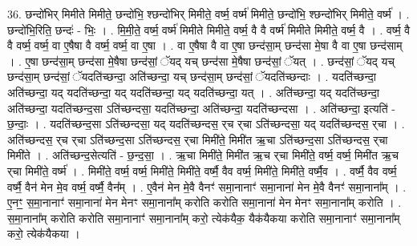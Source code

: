 \documentclass[17pt]{extarticle}
\begin{document}
36. छन्दो॑भिर् मिमीते मिमीते॒ छन्दो॑भि॒ श्छन्दो॑भिर् मिमीते॒ वर्ष्म॒ वर्ष्म॑ मिमीते॒ छन्दो॑भि॒ श्छन्दो॑भिर् मिमीते॒ वर्ष्म॑ । . छन्दो॑भि॒रिति॒ छन्दः॑ - भिः॒ । . मि॒मी॒ते॒ वर्ष्म॒ वर्ष्म॑ मिमीते मिमीते॒ वर्ष्म॒ वै वै वर्ष्म॑ मिमीते मिमीते॒ वर्ष्म॒ वै । . वर्ष्म॒ वै वै वर्ष्म॒ वर्ष्म॒ वा ए॒षैषा वै वर्ष्म॒ वर्ष्म॒ वा ए॒षा । . वा ए॒षैषा वै वा ए॒षा छन्द॑सा॒म् छन्द॑सा मे॒षा वै वा ए॒षा छन्द॑साम् । . ए॒षा छन्द॑सा॒म् छन्द॑सा मे॒षैषा छन्द॑सां॒ ॅयद् यच् छन्द॑सा मे॒षैषा छन्द॑सां॒ ॅयत् । . छन्द॑सां॒ ॅयद् यच् छन्द॑सा॒म् छन्द॑सां॒ ॅयदति॑च्छन्दा॒ अति॑च्छन्दा॒ यच् छन्द॑सा॒म् छन्द॑सां॒ ॅयदति॑च्छन्दाः । . यदति॑च्छन्दा॒ अति॑च्छन्दा॒ यद् यदति॑च्छन्दा॒ यद् यदति॑च्छन्दा॒ यद् यदति॑च्छन्दा॒ यत् । . अति॑च्छन्दा॒ यद् यदति॑च्छन्दा॒ अति॑च्छन्दा॒ यदति॑च्छन्द॒सा ऽति॑च्छन्दसा॒ यदति॑च्छन्दा॒  अति॑च्छन्दा॒ यदति॑च्छन्दसा । . अति॑च्छन्दा॒ इत्यति॑ - छ॒न्दाः॒ । . यदति॑च्छन्द॒सा ऽति॑च्छन्दसा॒ यद् यदति॑च्छन्दस॒ र्‌च र्‌चा ऽति॑च्छन्दसा॒ यद् यदति॑च्छन्दस॒ र्‌चा । . अति॑च्छन्दस॒ र्‌च र्‌चा ऽति॑च्छन्द॒सा ऽति॑च्छन्दस॒ र्‌चा मिमी॑ते॒ मिमी॑त ऋ॒चा ऽति॑च्छन्द॒सा ऽति॑च्छन्दस॒ र्‌चा मिमी॑ते । . अति॑च्छन्द॒सेत्यति॑ - छ॒न्द॒सा॒ । . ऋ॒चा मिमी॑ते॒ मिमी॑त ऋ॒च र्‌चा मिमी॑ते॒ वर्ष्म॒ वर्ष्म॒ मिमी॑त ऋ॒च र्‌चा मिमी॑ते॒ वर्ष्म॑ । . मिमी॑ते॒ वर्ष्म॒ वर्ष्म॒ मिमी॑ते॒ मिमी॑ते॒ वर्ष्मै॒ वैव वर्ष्म॒ मिमी॑ते॒ मिमी॑ते॒ वर्ष्मै॒व । . वर्ष्मै॒ वैव वर्ष्म॒ वर्ष्मै॒ वैन॑ मेन मे॒व वर्ष्म॒ वर्ष्मै॒ वैन᳚म् । . ए॒वैन॑ मेन मे॒वै वैनꣳ॑ समा॒नानाꣳ॑ समा॒नाना॑ मेन मे॒वै वैनꣳ॑ समा॒नाना᳚म् । . ए॒नꣳ॒॒ स॒मा॒नानाꣳ॑ समा॒नाना॑ मेन मेनꣳ समा॒नाना᳚म् करोति करोति समा॒नाना॑ मेन मेनꣳ समा॒नाना᳚म् करोति । . स॒मा॒नाना᳚म् करोति करोति समा॒नानाꣳ॑ समा॒नाना᳚म् करो॒ त्येक॑यैक॒ यैक॑यैकया करोति समा॒नानाꣳ॑ समा॒नाना᳚म् करो॒ त्येक॑यैकया । \newline
\end{document}

